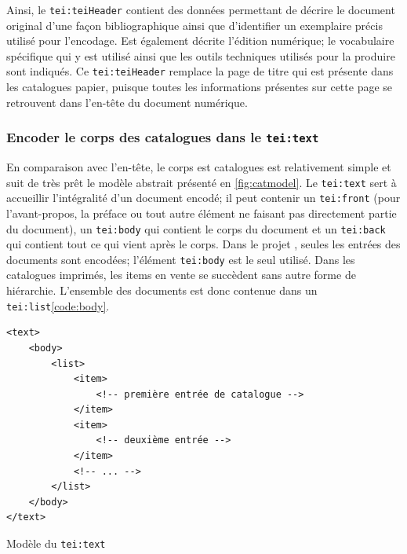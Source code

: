 Ainsi, le \texttt{tei:teiHeader} contient des données permettant de décrire le document original d'une façon bibliographique ainsi que d'identifier un exemplaire précis utilisé pour l'encodage. Est également décrite l'édition numérique; le vocabulaire spécifique qui y est utilisé ainsi que les outils techniques utilisés pour la produire sont indiqués. Ce \texttt{tei:teiHeader} remplace la page de titre qui est présente dans les catalogues papier, puisque toutes les informations présentes sur cette page se retrouvent dans l'en-tête du document numérique.

\subsubsection{Encoder le corps des catalogues dans le \texttt{tei:text}}
En comparaison avec l'en-tête, le corps est catalogues est relativement simple et suit de très prêt le modèle abstrait présenté en \ref{fig:catmodel}. Le \texttt{tei:text} sert à accueillir l'intégralité d'un document encodé; il peut contenir un \texttt{tei:front} (pour l'avant-propos, la préface ou tout autre élément ne faisant pas directement partie du document), un \texttt{tei:body} qui contient le corps du document et un \texttt{tei:back} qui contient tout ce qui vient après le corps. Dans le projet \mssktb{}, seules les entrées des documents sont encodées; l'élément \texttt{tei:body} est le seul utilisé. Dans les catalogues imprimés, les items en vente se succèdent sans autre forme de hiérarchie. L'ensemble des documents est donc contenue dans un \texttt{tei:list}\ref{code:body}.

\begin{listing}[h]
	\begin{verbatim}
<text>
	<body>
		<list>
			<item>
				<!-- première entrée de catalogue -->
			</item>
			<item>
				<!-- deuxième entrée -->
			</item>
			<!-- ... -->
		</list>
	</body>
</text>
	\end{verbatim}
	\caption{Modèle du \texttt{tei:text}}
	\label{code:body}
\end{listing}

